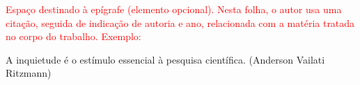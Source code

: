 \textcolor{red}{Espaço destinado à epígrafe (elemento opcional). 
Nesta folha, o autor usa uma citação, seguida de indicação de autoria e ano, relacionada com a matéria tratada no corpo do trabalho.
Exemplo:} 

A inquietude é o estímulo essencial à pesquisa científica.
(Anderson Vailati Ritzmann)
